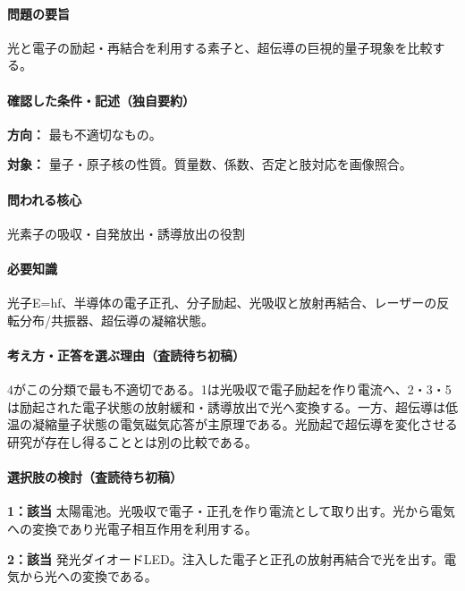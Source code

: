 \paragraph{問題の要旨} 光と電子の励起・再結合を利用する素子と、超伝導の巨視的量子現象を比較する。

\paragraph{確認した条件・記述（独自要約）}\mbox{}\par

\noindent\textbf{方向：} 最も不適切なもの。\par

\noindent\textbf{対象：} 量子・原子核の性質。質量数、係数、否定と肢対応を画像照合。\par

\paragraph{問われる核心} 光素子の吸収・自発放出・誘導放出の役割

\paragraph{必要知識} 光子E=\allowbreak{}hf、半導体の電子正孔、分子励起、光吸収と放射再結合、レーザーの反転分布/共振器、超伝導の凝縮状態。

\paragraph{考え方・正答を選ぶ理由（査読待ち初稿）} 4がこの分類で最も不適切である。1は光吸収で電子励起を作り電流へ、2・3・5は励起された電子状態の放射緩和・誘導放出で光へ変換する。一方、超伝導は低温の凝縮量子状態の電気磁気応答が主原理である。光励起で超伝導を変化させる研究が存在し得ることとは別の比較である。

\paragraph{選択肢の検討（査読待ち初稿）}\mbox{}\par

\noindent\textbf{1：該当} 太陽電池。光吸収で電子・正孔を作り電流として取り出す。光から電気への変換であり光電子相互作用を利用する。\par

\noindent\textbf{2：該当} 発光ダイオードLED。注入した電子と正孔の放射再結合で光を出す。電気から光への変換である。\par

